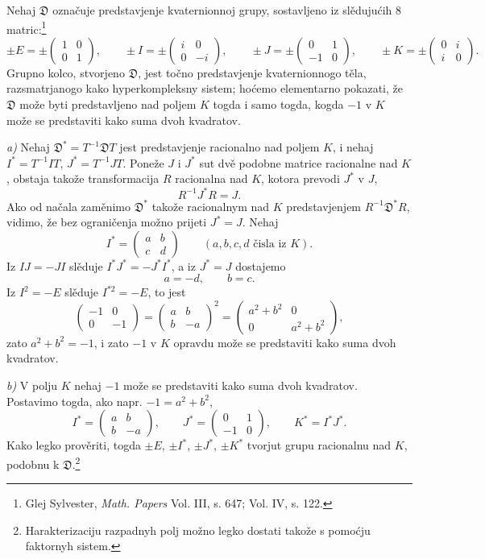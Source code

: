 \documentclass[11pt]{article}
\newcommand{\mat}[1]{\begin{pmatrix}#1\end{pmatrix}}
\begin{document}
\noindent Nehaj $\mathfrak{D}$ označuje predstavjenje kvaternionnoj grupy, sostavljeno iz slědujućih 8 matric:\footnote{Glej Sylvester, \emph{Math. Papers} Vol. III, s. 647; Vol. IV, s. 122.}
\[
\pm E=\pm\mat{1&0\\0&1},\qquad
\pm I=\pm\mat{i&0\\0&-i},\qquad
\pm J=\pm\mat{0&1\\-1&0},\qquad
\pm K=\pm\mat{0&i\\ i&0}.
\]
Grupno kolco, stvorjeno $\mathfrak{D}$, jest točno predstavjenje kvaternionnogo těla, razsmatrjanogo kako hyperkompleksny sistem; hoćemo elementarno pokazati, že $\mathfrak{D}$ može byti predstavljeno nad poljem $K$ togda i samo togda, kogda $-1$ v $K$ može se predstaviti kako suma dvoh kvadratov.

\medskip

\noindent \emph{a)} Nehaj $\mathfrak{D}^*=T^{-1}\mathfrak{D}T$ jest predstavjenje racionalno nad poljem $K$, i nehaj $I^*=T^{-1}IT$, $J^*=T^{-1}JT$. Poneže $J$ i $J^*$ sut dvě podobne matrice racionalne nad $K$, obstaja takože transformacija $R$ racionalna nad $K$, kotora prevodi $J^*$ v $J$,
\[
        R^{-1}J^*R=J.
\]
Ako od načala zaměnimo $\mathfrak{D}^*$ takože racionalnym nad $K$ predstavjenjem $R^{-1}\mathfrak{D}^*R$, vidimo, že bez ograničenja možno prijeti $J^*=J$. Nehaj
\[
        I^*=\mat{a&b\\ c&d}\qquad (a,b,c,d\text{ čisla iz }K).
\]
Iz $IJ=-JI$ slěduje $I^*J^*=-J^*I^*$, a iz $J^*=J$ dostajemo
\[
        a=-d,
        \qquad b=c.
\]
Iz $I^2=-E$ slěduje $I^{*2}=-E$, to jest
\[
        \mat{-1&0\\0&-1}=\mat{a&b\\ b&-a}^2
        =\mat{a^2+b^2&0\\0&a^2+b^2},
\]
zato $a^2+b^2=-1$, i zato $-1$ v $K$ opravdu može se predstaviti kako suma dvoh kvadratov.

\medskip

\noindent \emph{b)} V polju $K$ nehaj $-1$ može se predstaviti kako suma dvoh kvadratov. Postavimo togda, ako napr. $-1=a^2+b^2$,
\[
        I^*=\mat{a&b\\ b&-a},\qquad
        J^*=\mat{0&1\\-1&0},\qquad
        K^*=I^*J^*.
\]
Kako legko prověriti, togda $\pm E$, $\pm I^*$, $\pm J^*$, $\pm K^*$ tvorjut grupu racionalnu nad $K$, podobnu k $\mathfrak{D}$.\footnote{Harakterizaciju razpadnyh polj možno legko dostati takože s pomoćju faktornyh sistem.}
\end{document}
